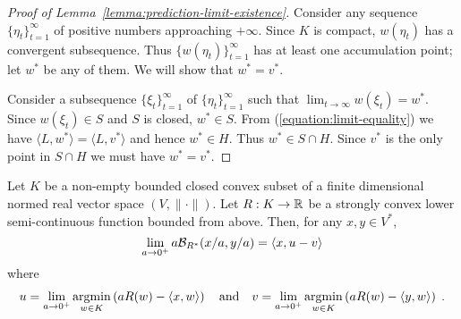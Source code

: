 \begin{proof}[Proof of Lemma~\ref{lemma:prediction-limit-existence}]
Consider any sequence $\{\eta_t\}_{t=1}^\infty$ of positive numbers approaching
$+\infty$.  Since $K$ is compact, $w(\eta_t)$ has a convergent subsequence.
Thus $\{w(\eta_t)\}_{t=1}^\infty$ has at least one accumulation point; let
$w^*$ be any of them. We will show that $w^* = v^*$.

Consider a subsequence $\{\xi_t\}_{t=1}^\infty$ of $\{\eta_t\}_{t=1}^\infty$
such that $\lim_{t \to \infty} w(\xi_t) = w^*$.  Since $w(\xi_t) \in S$ and $S$
is closed, $w^* \in S$.  From (\ref{equation:limit-equality}) we have $\langle
L, w^* \rangle = \langle L, v^* \rangle$ and hence $w^* \in H$. Thus $w^* \in S
\cap H$.  Since $v^*$ is the only point in $S \cap H$ we must have $w^* = v^*$.
\end{proof}

\begin{lemma}
\label{lemma:limit-bregman-divergence}
Let $K$ be a non-empty bounded closed convex subset of a finite dimensional
normed real vector space $(V, \|\cdot\|)$.  Let $R:K \to \mathbb{R}$ be a strongly
convex lower semi-continuous function bounded from above. Then, for any $x,y
\in V^*$,
$$
\lim_{a \to 0^+} a \mathcal{B}_{R^*}(x/a, y/a) = \langle x, u - v \rangle \\
$$
where
\begin{align*}
u = \lim_{a \to 0^+} \operatorname*{argmin}_{w \in K} \left( a R(w) - \langle x, w \rangle \right)
\quad \text{and} \quad
v = \lim_{a \to 0^+} \operatorname*{argmin}_{w \in K} \left( a R(w) - \langle y, w \rangle \right) \; .
\end{align*}
\end{lemma}


